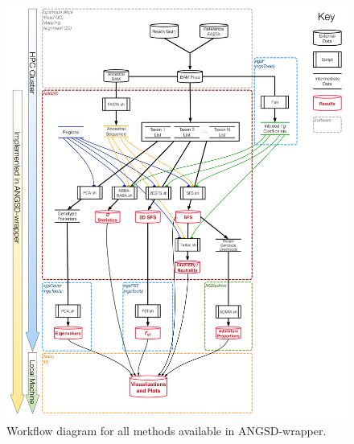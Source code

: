 \renewcommand{\thefigure}{S\arabic{figure}}
\renewcommand{\thetable}{S\arabic{table}}
\setcounter{figure}{0}
\setcounter{table}{0}

\begin{figure}
\centering
\includegraphics[width=\linewidth]{figures/Wiki_Workflow.pdf}
\caption{Workflow diagram for all methods available in ANGSD-wrapper.}
\label{fig:supp2}
\end{figure}

